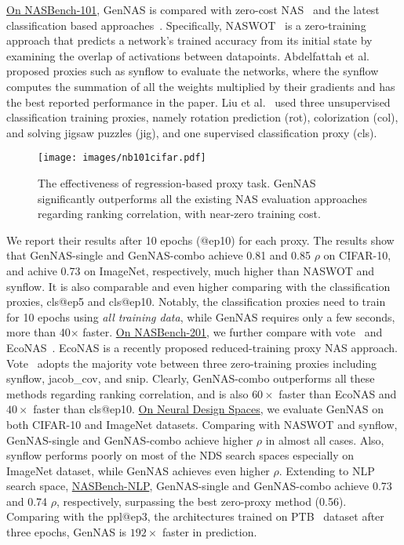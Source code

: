 \documentclass{article}
\begin{document}
\underline{On NASBench-101},
GenNAS is compared with zero-cost NAS~\cite{abdelfattah2021zero, mellor2020neural} and the latest classification based approaches~\cite{liu2020labels}.
Specifically, NASWOT~\cite{mellor2020neural} is a zero-training approach that predicts a network's trained accuracy from its initial state by examining the overlap of activations between datapoints.
Abdelfattah et al.~\cite{abdelfattah2021zero} proposed proxies such as synflow to evaluate the networks, where the synflow computes the summation of all the weights multiplied by their gradients and has the best reported performance in the paper.
Liu et al.~\cite{liu2020labels} used three unsupervised classification training proxies, namely rotation prediction (rot), colorization (col), and solving jigsaw puzzles (jig), and one supervised classification proxy (cls).
\begin{wrapfigure}{h}{0.5\textwidth}
  \vspace{-12pt}
  \begin{center}
\texttt{[image: images/nb101cifar.pdf]}
  \end{center}
  \vspace{-5pt}

  \caption{The effectiveness of regression-based proxy task. GenNAS significantly outperforms all the existing NAS evaluation approaches regarding ranking correlation, with near-zero training cost.}
  \label{fig:regression-visulization}
\end{wrapfigure}
We report their results after 10 epochs (@ep10) for each proxy.
The results show that GenNAS-single and GenNAS-combo achieve 0.81 and 0.85 $\rho$ on CIFAR-10, and achive 0.73 on ImageNet, respectively, much higher than NASWOT and synflow. It is also comparable and even higher comparing with the classification proxies, cls@ep5 and cls@ep10.
Notably, the classification proxies need to train for 10 epochs using \textit{all training data}, while GenNAS requires only a few seconds, more than 40$\times$ faster. 
\underline{On NASBench-201}, we further compare with vote~\cite{abdelfattah2021zero} and EcoNAS~\cite{zhou2020econas}.
EcoNAS is a recently proposed reduced-training proxy NAS approach.
Vote~\cite{abdelfattah2021zero} adopts the majority vote between three zero-training proxies including synflow, jacob\_cov, and snip.
Clearly, GenNAS-combo outperforms all these methods regarding ranking correlation, and is also $60\times$ faster than EcoNAS and $40\times$ faster than cls@ep10.
\underline{On Neural Design Spaces}, we evaluate GenNAS on both CIFAR-10 and ImageNet datasets. 
Comparing with NASWOT and synflow, GenNAS-single and GenNAS-combo achieve higher $\rho$ in almost all cases. 
Also, synflow performs poorly on most of the NDS search spaces especially on ImageNet dataset, while GenNAS achieves even higher $\rho$.
Extending to NLP search space, \underline{NASBench-NLP}, GenNAS-single and GenNAS-combo achieve 0.73 and 0.74 $\rho$, respectively, surpassing the best zero-proxy method (0.56). Comparing with the ppl@ep3, the architectures trained on PTB~\cite{marcus1993building} dataset after three epochs, GenNAS is $192\times$ faster in prediction.
\end{document}
